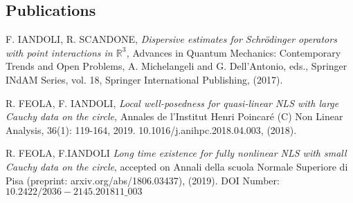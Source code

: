 \documentclass[margin,line,pifont,palatino,courier]{res}
\newenvironment{list2}{
  \begin{list}{$\bullet$}{%
      \setlength{\itemsep}{0in}
      \setlength{\parsep}{0in} \setlength{\parskip}{0in}
      \setlength{\topsep}{0in} \setlength{\partopsep}{0in}
      \setlength{\leftmargin}{0.2in}}}{\end{list}}
\begin{document}
\begin{resume}
\section{\sc Publications}

{\rm{F. IANDOLI, R. SCANDONE}},  \textit{Dispersive estimates for Schr\"odinger operators with point interactions in $\mathbb{R}^3$,}  Advances in Quantum Mechanics: Contemporary Trends and Open Problems, A. Michelangeli and G. Dell'Antonio, eds., Springer INdAM Series, vol. 18, Springer International Publishing, (2017).

{\rm{R. FEOLA, F. IANDOLI}},  \textit{Local well-posedness for quasi-linear NLS with large Cauchy data on the circle,}  Annales de l'Institut Henri Poincar\'e (C) Non Linear Analysis, 36(1): 119-164, 2019. 10.1016/j.anihpc.2018.04.003, (2018).

{\rm{R. FEOLA, F.IANDOLI}} \textit{Long time existence for fully nonlinear NLS with small Cauchy data on the circle}, accepted on  Annali della scuola Normale Superiore di Pisa  (preprint: arxiv.org/abs/1806.03437), 
(2019).  DOI Number: $10.2422/2036-2145.201811\_ 003$




% 
%
%
%
%
%




\end{resume}
\end{document}

